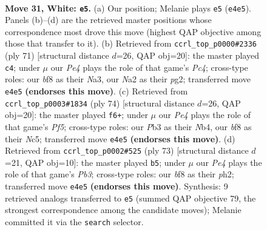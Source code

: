\documentclass[11pt]{article}
\begin{document}
\clearpage

\begin{figure}[p]\centering
\begin{subfigure}{0.46\textwidth}\centering
\resizebox{\linewidth}{!}{%
\newchessgame
\chessboard[
  setfen={5b2/3k4/3n4/2pP2p1/4P3/1P1K4/N7/8 w - - 0 31},
  showmover=false,
  pgfstyle=straightmove, color=movearrow, markmove={e4-e5}
]}
\caption{}
\end{subfigure}\hfill
\begin{subfigure}{0.46\textwidth}\centering
\resizebox{\linewidth}{!}{%
\newchessgame
\chessboard[
  setfen={8/p7/4N2k/2p5/1p6/n2P1P2/3K2P1/8 b - - 0 36},
  showmover=false,
  pgfstyle=straightmove, color=movearrow, markmove={c5-c4}
]}
\caption{}
\end{subfigure}
\\[4pt]
\begin{subfigure}{0.46\textwidth}\centering
\resizebox{\linewidth}{!}{%
\newchessgame
\chessboard[
  setfen={b7/4k1pp/8/2N2PP1/1N1P4/4n3/8/6K1 w - - 1 38},
  showmover=false,
  pgfstyle=straightmove, color=movearrow, markmove={f5-f6}
]}
\caption{}
\end{subfigure}\hfill
\begin{subfigure}{0.46\textwidth}\centering
\resizebox{\linewidth}{!}{%
\newchessgame
\chessboard[
  setfen={8/8/1p4k1/p2N2p1/3n2K1/8/PP5P/8 b - - 1 37},
  showmover=false,
  pgfstyle=straightmove, color=movearrow, markmove={b6-b5}
]}
\caption{}
\end{subfigure}
\caption{\textbf{Move 31, White: \texttt{e5}.} (a) Our position; Melanie plays \texttt{e5} (\texttt{e4e5}). Panels (b)--(d) are the retrieved master positions whose correspondence most drove this move (highest QAP objective among those that transfer to it). (b) Retrieved from \texttt{ccrl\_top\_p0000\#2336} (ply 71) [structural distance $d$=26, QAP obj=20]: the master played \texttt{c4}; under $\mu$ our \emph{Pe4} plays the role of that game's \emph{Pc4}; cross-type roles: our \emph{b}f8 as their \emph{N}a3, our \emph{N}a2 as their \emph{p}g2; transferred move \texttt{e4e5} \textbf{(endorses this move)}. (c) Retrieved from \texttt{ccrl\_top\_p0003\#1834} (ply 74) [structural distance $d$=26, QAP obj=20]: the master played \texttt{f6+}; under $\mu$ our \emph{Pe4} plays the role of that game's \emph{Pf5}; cross-type roles: our \emph{P}b3 as their \emph{N}b4, our \emph{b}f8 as their \emph{N}c5; transferred move \texttt{e4e5} \textbf{(endorses this move)}. (d) Retrieved from \texttt{ccrl\_top\_p0002\#525} (ply 73) [structural distance $d$=21, QAP obj=10]: the master played \texttt{b5}; under $\mu$ our \emph{Pe4} plays the role of that game's \emph{Pb3}; cross-type roles: our \emph{b}f8 as their \emph{p}h2; transferred move \texttt{e4e5} \textbf{(endorses this move)}. Synthesis: 9 retrieved analogs transferred to \texttt{e5} (summed QAP objective 79, the strongest correspondence among the candidate moves); Melanie committed it via the \texttt{search} selector.}
\label{fig:thought-m60}
\end{figure}
\end{document}
